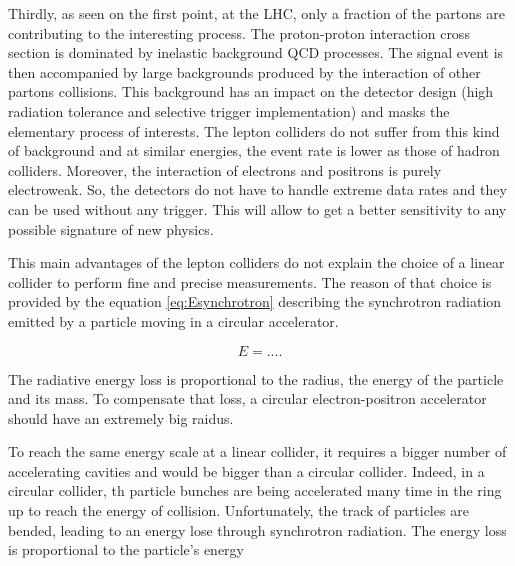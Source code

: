     Thirdly, as seen on the first point, at the \gls{LHC}, only a fraction of the partons are contributing to the interesting process. 
    The proton-proton interaction cross section is dominated by inelastic background QCD processes.
    The signal event is then accompanied by large backgrounds produced by the interaction of other partons collisions.
    This background has an impact on the detector design (high radiation tolerance and selective trigger implementation) and masks the elementary process of interests. 
    The lepton colliders do not suffer from this kind of background and at similar energies, the event rate is lower as those of hadron colliders.
    Moreover, the interaction of electrons and positrons is purely electroweak.
    So, the detectors do not have to handle extreme data rates and they can be used without any trigger.
    This will allow to get a better sensitivity to any possible signature of new physics.

    This main advantages of the lepton colliders do not explain the choice of a linear collider to perform fine and precise measurements.
    The reason of that choice is provided by the equation \ref{eq:Esynchrotron} describing the synchrotron radiation emitted by a particle moving in a circular accelerator.
    
    \begin{equation}
     E = ....
       \label{eq:Esynchrotron}
    \end{equation} 

    The radiative energy loss is proportional to the radius, the energy of the particle and its mass.
    To compensate that loss, a circular electron-positron accelerator should have an extremely big raidus. 



    To reach the same energy scale at a linear collider, it requires a bigger number of accelerating cavities and would be bigger than a circular collider.
    Indeed, in a circular collider, th particle bunches are being accelerated many time in the ring up to reach the energy of collision.
    Unfortunately, the track of particles are bended, leading to an energy lose through synchrotron radiation.
    The energy loss is proportional to the particle's energy
    

    
